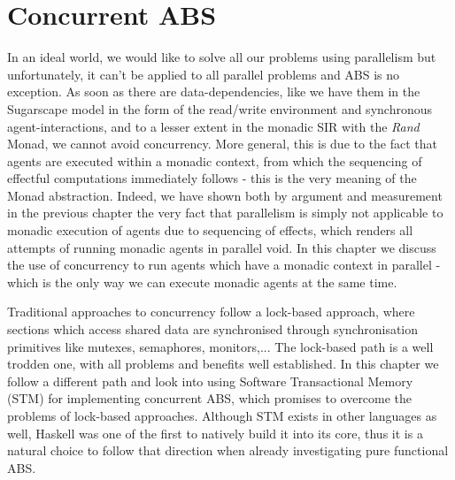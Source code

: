 \chapter{Concurrent ABS}
\label{ch:concurrent_abs}


In an ideal world, we would like to solve all our problems using parallelism but unfortunately, it can't be applied to all parallel problems and ABS is no exception. As soon as there are data-dependencies, like we have them in the Sugarscape model in the form of the read/write environment and synchronous agent-interactions, and to a lesser extent in the monadic SIR with the \textit{Rand} Monad, we cannot avoid concurrency. More general, this is due to the fact that agents are executed within a monadic context, from which the  sequencing of effectful computations immediately follows - this is the very meaning of the Monad abstraction. Indeed, we have shown both by argument and measurement in the previous chapter the very fact that parallelism is simply not applicable to monadic execution of agents due to sequencing of effects, which renders all attempts of running monadic agents in parallel void. In this chapter we discuss the use of concurrency to run agents which have a monadic context in parallel - which is the only way we can execute monadic agents at the same time.

\medskip

Traditional approaches to concurrency follow a lock-based approach, where sections which access shared data are synchronised through synchronisation primitives like mutexes, semaphores, monitors,... The lock-based path is a well trodden one, with all problems and benefits well established. In this chapter we follow a different path and look into using Software Transactional Memory (STM) for implementing concurrent ABS, which promises to overcome the problems of lock-based approaches. Although STM exists in other languages as well, Haskell was one of the first to natively build it into its core, thus it is a natural choice to follow that direction when already investigating pure functional ABS.

